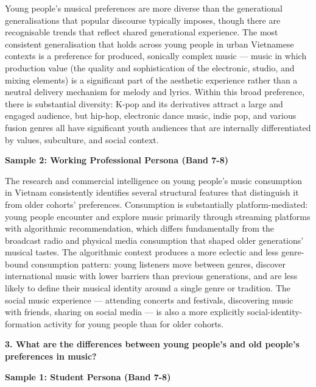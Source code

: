 Young people's musical preferences are more diverse than the generational generalisations that popular discourse typically imposes, though there are recognisable trends that reflect shared generational experience. The most consistent generalisation that holds across young people in urban Vietnamese contexts is a preference for produced, sonically complex music — music in which production value (the quality and sophistication of the electronic, studio, and mixing elements) is a significant part of the aesthetic experience rather than a neutral delivery mechanism for melody and lyrics. Within this broad preference, there is substantial diversity: K-pop and its derivatives attract a large and engaged audience, but hip-hop, electronic dance music, indie pop, and various fusion genres all have significant youth audiences that are internally differentiated by values, subculture, and social context.

\textbf{Sample 2: Working Professional Persona (Band 7-8)}

The research and commercial intelligence on young people's music consumption in Vietnam consistently identifies several structural features that distinguish it from older cohorts' preferences. Consumption is substantially platform-mediated: young people encounter and explore music primarily through streaming platforms with algorithmic recommendation, which differs fundamentally from the broadcast radio and physical media consumption that shaped older generations' musical tastes. The algorithmic context produces a more eclectic and less genre-bound consumption pattern: young listeners move between genres, discover international music with lower barriers than previous generations, and are less likely to define their musical identity around a single genre or tradition. The social music experience — attending concerts and festivals, discovering music with friends, sharing on social media — is also a more explicitly social-identity-formation activity for young people than for older cohorts.

\separator

\begin{ieltsquestion}
\textbf{3. What are the differences between young people's and old people's preferences in music?}
\end{ieltsquestion}
\textbf{Sample 1: Student Persona (Band 7-8)}

